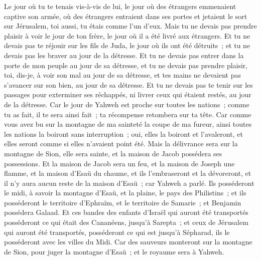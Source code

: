 \begin{multicols}{2}
Le jour où tu te tenais vis-à-vis de lui, le jour où des étrangers emmenaient captive son armée, où des étrangers entraient dans ses portes et jetaient le sort sur Jérusalem, toi aussi, tu étais comme l'un d'eux.
Mais tu ne devais pas prendre plaisir à voir le jour de ton frère, le jour où il a été livré aux étrangers. Et tu ne devais pas te réjouir sur les fils de Juda, le jour où ils ont été détruits~; et tu ne devais pas les braver au jour de la détresse.
Et tu ne devais pas entrer dans la porte de mon peuple au jour de sa détresse, et tu ne devais pas prendre plaisir, toi, dis-je, à voir son mal au jour de sa détresse, et tes mains ne devaient pas s'avancer sur son bien, au jour de sa détresse.
Et tu ne devais pas te tenir sur les passages pour exterminer ses réchappés, ni livrer ceux qui étaient restés, au jour de la détresse.
Car le jour de Yahweh est proche sur toutes les nations~; comme tu as fait, il te sera ainsi fait~; ta récompense retombera sur ta tête.
Car comme vous avez bu sur la montagne de ma sainteté la coupe de ma fureur, ainsi toutes les nations la boiront sans interruption~; oui, elles la boiront et l'avaleront, et elles seront comme si elles n'avaient point été.
Mais la délivrance sera sur la montagne de Sion, elle sera sainte, et la maison de Jacob possédera ses possessions.
Et la maison de Jacob sera un feu, et la maison de Joseph une flamme, et la maison d'Esaü du chaume, et ils l'embraseront et la dévoreront, et il n'y aura aucun reste de la maison d'Esaü~; car Yahweh a parlé.
Ils posséderont le midi, à savoir la montagne d'Esaü, et la plaine, le pays des Philistins~; et ils posséderont le territoire d'Ephraïm, et le territoire de Samarie~; et Benjamin possédera Galaad.
Et ces bandes des enfants d'Israël qui auront été transportés posséderont ce qui était des Cananéens, jusqu'à Sarepta~; et ceux de Jérusalem qui auront été transportés, posséderont ce qui est jusqu'à Sépharad, ils le posséderont avec les villes du Midi.
Car des sauveurs monteront sur la montagne de Sion, pour juger la montagne d'Esaü~; et le royaume sera à Yahweh.
\PPE{}
\end{multicols}

